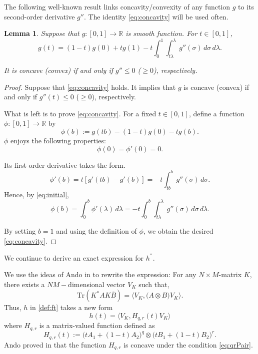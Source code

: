 \documentclass{article}
\numberwithin{equation}{section}
\newtheorem{lemma}[theorem]{Lemma}
\begin{document}
The following well-known result links concavity/convexity of any function $g$ to its second-order derivative $g''$. The identity \eqref{eq:concavity} will be used often.
\begin{lemma}\label{LM:concavity}
Suppose that $g:[0,1]\rightarrow \mathbb{R}$ is smooth function. For $t\in [0,1]$, 
\begin{equation}\label{eq:concavity}
g(t) =(1-t)g(0) + tg(1) -t \int_{0}^{1} \int_{t\lambda}^{\lambda} g''(\sigma) \, d\sigma \, d\lambda.
\end{equation}

It is concave (convex) if and only if $g'' \leq 0$ ($\geq 0$), respectively.
\end{lemma}
\begin{proof}
Suppose that \eqref{eq:concavity} holds. It implies that $g$ is concave (convex) if and only if $g''(t) \leq 0$ ($\geq 0$), respectively.

What is left is to prove \eqref{eq:concavity}. For a fixed $t\in [0,1]$, define a function $\phi:[0,1]\rightarrow \mathbb{R}$ by
\[
\phi(b) := g(tb) - (1-t)g(0) - tg(b).
\]
$\phi$ enjoys the following properties:
\begin{equation}\label{eq:initial}
\phi(0) = \phi'(0)=0.
\end{equation}

Its first order derivative takes the form.
    \[
    \phi'(b) = t[g'(tb) - g'(b)] = -t \int_{tb}^{b} g''(\sigma) \, d\sigma.
    \]
Hence, by \eqref{eq:initial},
\[
\phi(b) = \int_{0}^{b} \phi'(\lambda) \, d\lambda = -t \int_{0}^{b} \int_{t\lambda}^{\lambda} g''(\sigma) \, d\sigma \, d\lambda.
\] 

By setting $b=1$ and using the definition of $\phi$, we obtain the desired \eqref{eq:concavity}.



\end{proof}



We continue to derive an exact expression for $h^{''}$.

We use the ideas of Ando in \cite{ANDO1979203} to rewrite the expression: For any $N\times M$-matrix $K$, there exists a $NM-$dimensional vector $V_{K}$ such that,
\begin{equation}\label{eqn:represen}
    \text{Tr}(K^* A K \overline{B}) = \langle V_K, \big(A \otimes B\big)  V_K \rangle.
\end{equation}
Thus, $h$ in \eqref{def:ft} takes a new form
\begin{equation}\label{eq:htNew}
    h(t) =\langle V_K, H_{q,r}(t) V_K \rangle
\end{equation} 
where $H_{q,r}$ is a matrix-valued function defined as
\begin{equation*}
    H_{q,r}(t) := \big(tA_1 + (1-t)A_2\big)^q \otimes \big(tB_1 + (1-t)B_2\big)^r.
\end{equation*}
Ando proved in \cite{ANDO1979203} that the function $H_{q,r}$ is concave under the condition \eqref{eq:qrPair}.
\end{document}
